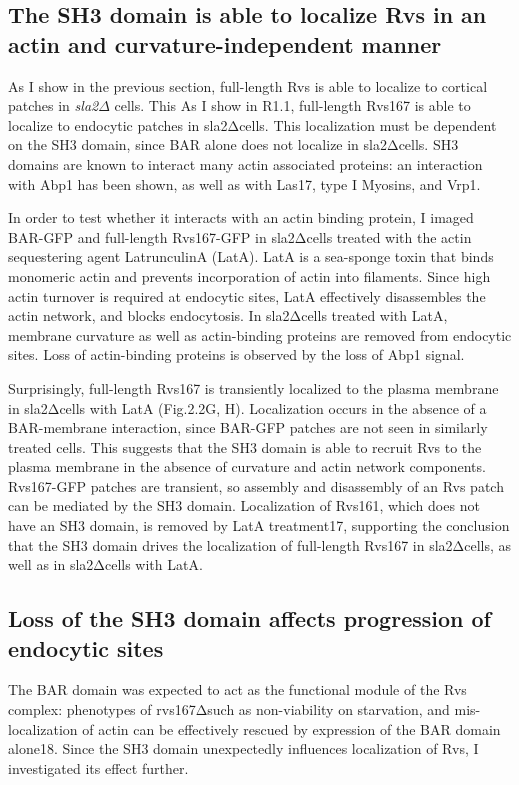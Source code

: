 	\subsection{The SH3 domain is able to localize Rvs in an actin and curvature-independent manner}
	\label{delsh3_latA}
	As I show in the previous section, full-length Rvs is able to localize to cortical patches in \textit{sla2$\Delta$} cells. This As I show in R1.1, full-length Rvs167 is able to localize to endocytic patches in sla2Δcells. This localization must be dependent on the SH3 domain, since BAR alone does not localize in sla2Δcells. SH3 domains are known to interact many actin associated proteins: an interaction with Abp1 has been shown, as well as with Las17, type I Myosins, and Vrp1. 
	\vspace{5mm}
	
In order to test whether it interacts with an actin binding protein, I imaged BAR-GFP and full-length Rvs167-GFP in sla2Δcells treated with the actin sequestering agent LatrunculinA (LatA). LatA is a sea-sponge toxin that binds monomeric actin and prevents incorporation of actin into filaments. Since high actin turnover is required at endocytic sites, LatA effectively disassembles the actin network, and blocks endocytosis. In sla2Δcells treated with LatA, membrane curvature as well as actin-binding proteins are removed from endocytic sites. Loss of actin-binding proteins is observed by the loss of Abp1 signal.

	\vspace{5mm}
Surprisingly, full-length Rvs167 is transiently localized to the plasma membrane in sla2Δcells with LatA (Fig.2.2G, H). Localization occurs in the absence of a BAR-membrane interaction, since BAR-GFP patches are not seen in similarly treated cells. This suggests that the SH3 domain is able to recruit Rvs to the plasma membrane in the absence of curvature and actin network components. Rvs167-GFP patches are transient, so assembly and disassembly of an Rvs patch can be mediated by the SH3 domain. Localization of Rvs161, which does not have an SH3 domain, is removed by LatA treatment17, supporting the conclusion that the SH3 domain drives the localization of full-length Rvs167 in sla2Δcells, as well as in sla2Δcells with LatA. 



	\subsection{Loss of the SH3 domain affects progression of \\endocytic sites}
	\label{delsh3_movement}
The BAR domain was expected to act as the functional module of the Rvs complex: phenotypes of rvs167Δsuch as non-viability on starvation, and mis-localization of actin can be effectively rescued by expression of the BAR domain alone18. Since the SH3 domain unexpectedly influences localization of Rvs, I investigated its effect further.

